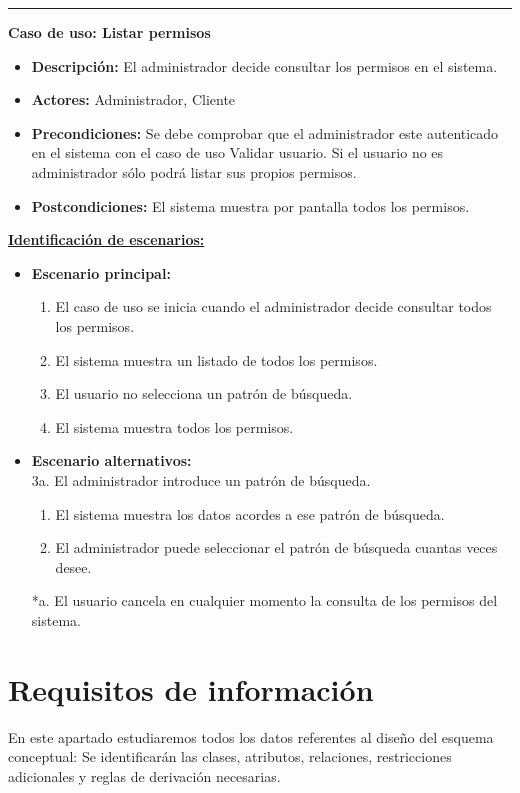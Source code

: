 \smallskip
\hrule height 1pt
\smallskip
\textbf{Caso de uso: Listar permisos}
\begin{itemize}\renewcommand{\labelitemi}{$\cdot$}
 \item \textbf{Descripción:} El administrador decide consultar los permisos en el sistema.
  \item \textbf{Actores:} Administrador, Cliente
  \item \textbf{Precondiciones:} Se debe comprobar que el administrador este autenticado en el sistema con el caso de uso Validar usuario. Si el usuario no es administrador sólo podrá listar sus propios permisos.
  \item \textbf{Postcondiciones:} El sistema muestra por pantalla todos los permisos.
\end{itemize}
\underline{\textbf{Identificación de escenarios:}}
\begin{itemize}\renewcommand{\labelitemi}{$\circ$}
 \item \textbf{Escenario principal:}
         \begin{enumerate}
          \item El caso de uso se inicia cuando el administrador decide consultar todos los permisos.
          \item El sistema muestra un listado de todos los permisos.
          \item El usuario no selecciona un patrón de búsqueda.
          \item El sistema muestra todos los permisos.
         \end{enumerate}
  \item \textbf{Escenario alternativos:}\\
  			3a. El administrador introduce un patrón de búsqueda.
  			\begin{enumerate}
  			\item El sistema muestra los datos acordes a ese patrón de búsqueda.
  			\item El administrador puede seleccionar el patrón de búsqueda cuantas veces desee.
  			\end{enumerate}
          *a. El usuario cancela en cualquier momento la consulta de los permisos del sistema.
\end{itemize}

\section{Requisitos de información}

En este apartado estudiaremos todos los datos referentes al diseño del esquema conceptual: Se identificarán las clases, atributos, relaciones, restricciones adicionales y reglas de derivación necesarias.

